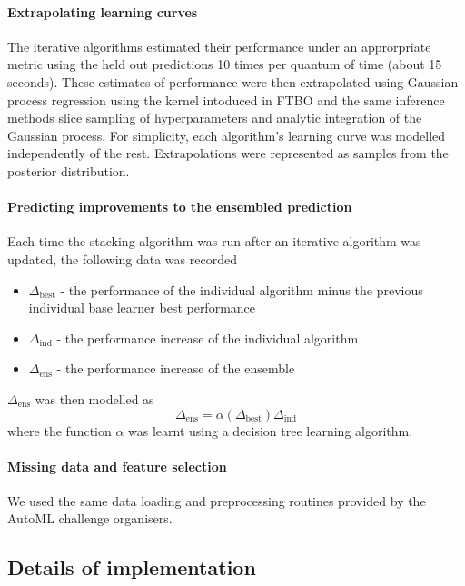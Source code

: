 \documentclass{article} %
\begin{document}
\paragraph{Extrapolating learning curves}

The iterative algorithms estimated their performance under an approrpriate metric using the held out predictions 10 times per quantum of time (about 15 seconds).
These estimates of performance were then extrapolated using Gaussian process regression using the kernel intoduced in FTBO and the same inference methods \ie slice sampling of hyperparameters and analytic integration of the Gaussian process.
For simplicity, each algorithm's learning curve was modelled independently of the rest.
Extrapolations were represented as samples from the posterior distribution.

\paragraph{Predicting improvements to the ensembled prediction}

Each time the stacking algorithm was run after an iterative algorithm was updated, the following data was recorded
\begin{itemize}
  \item $\Delta_\textrm{best}$ - the performance of the individual algorithm minus the previous individual base learner best performance
  \item $\Delta_\textrm{ind}$ - the performance increase of the individual algorithm
  \item $\Delta_\textrm{ens}$ - the performance increase of the ensemble
\end{itemize}
$\Delta_\textrm{ens}$ was then modelled as
\[
  \Delta_\textrm{ens} = \alpha(\Delta_\textrm{best})\Delta_\textrm{ind}
\]
where the function $\alpha$ was learnt using a decision tree learning algorithm.

\paragraph{Missing data and feature selection}

We used the same data loading and preprocessing routines provided by the AutoML challenge organisers.

\subsection{Details of implementation}
\end{document}

